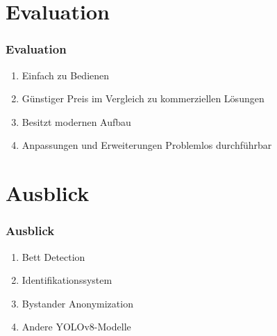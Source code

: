 \documentclass[aspectratio=169]{beamer}
\begin{document}
\section{Evaluation}
\begin{frame}
	\frametitle{Evaluation}
	\begin{enumerate}
		\item Einfach zu Bedienen
		\item Günstiger Preis im Vergleich zu kommerziellen Lösungen
		\item Besitzt modernen Aufbau
		\item Anpassungen und Erweiterungen Problemlos durchführbar
	\end{enumerate}
\end{frame}

\section{Ausblick}
\begin{frame}
	\frametitle{Ausblick}
	\begin{enumerate}
		\item Bett Detection
		\item Identifikationssystem
		\item Bystander Anonymization
		\item Andere YOLOv8-Modelle 
	\end{enumerate}
\end{frame}
\end{document}
